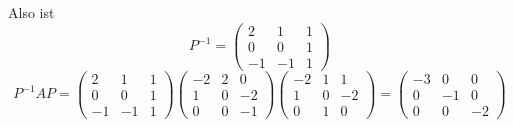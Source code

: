 \documentclass{article}
\begin{document}
Also ist
\[P^{-1} = \begin{pmatrix} 2 & 1 & 1 \\ 0 & 0 & 1 \\ -1 & -1 & 1 \end{pmatrix}\]
\[P^{-1}AP = \begin{pmatrix} 2 & 1 & 1 \\ 0 & 0 & 1 \\ -1 & -1 & 1 \end{pmatrix} \begin{pmatrix} -2 & 2 & 0 \\ 1 & 0 & -2 \\ 0 & 0 & -1 \end{pmatrix} \begin{pmatrix} -2 & 1 & 1 \\ 1 & 0 & -2 \\ 0 & 1 & 0 \end{pmatrix} = \begin{pmatrix} -3 & 0 & 0 \\ 0 & -1 & 0 \\ 0 & 0 & -2 \end{pmatrix}\]
\end{document}
